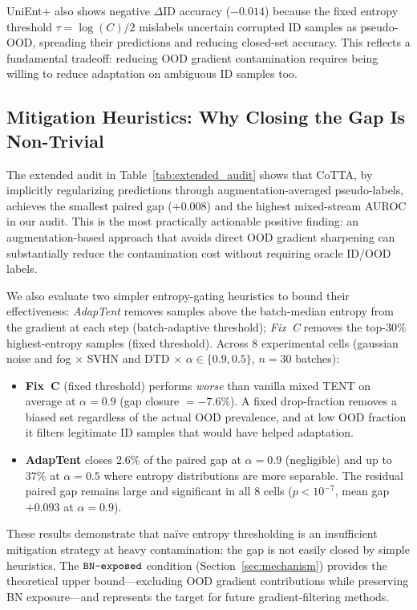 UniEnt+ also shows negative $\Delta$ID accuracy ($-0.014$) because the fixed entropy threshold $\tau = \log(C)/2$ mislabels uncertain corrupted ID samples as pseudo-OOD, spreading their predictions and reducing closed-set accuracy.
This reflects a fundamental tradeoff: reducing OOD gradient contamination requires being willing to reduce adaptation on ambiguous ID samples too.

\subsection{Mitigation Heuristics: Why Closing the Gap Is Non-Trivial}
\label{sec:mitigation}

The extended audit in Table~\ref{tab:extended_audit} shows that CoTTA, by implicitly regularizing predictions through augmentation-averaged pseudo-labels, achieves the smallest paired gap ($+0.008$) and the highest mixed-stream AUROC in our audit.
This is the most practically actionable positive finding: an augmentation-based approach that avoids direct OOD gradient sharpening can substantially reduce the contamination cost without requiring oracle ID/OOD labels.

We also evaluate two simpler entropy-gating heuristics to bound their effectiveness:
\emph{AdapTent} removes samples above the batch-median entropy from the gradient at each step (batch-adaptive threshold); \emph{Fix~C} removes the top-$30\%$ highest-entropy samples (fixed threshold).
Across 8 experimental cells (gaussian noise and fog $\times$ SVHN and DTD $\times$ $\alpha \in \{0.9, 0.5\}$, $n = 30$ batches):

\begin{itemize}[leftmargin=*,topsep=2pt,itemsep=1pt]
  \item \textbf{Fix~C} (fixed threshold) performs \emph{worse} than vanilla mixed TENT on average at $\alpha = 0.9$ (gap closure $= -7.6\%$). A fixed drop-fraction removes a biased set regardless of the actual OOD prevalence, and at low OOD fraction it filters legitimate ID samples that would have helped adaptation.
  \item \textbf{AdapTent} closes $2.6\%$ of the paired gap at $\alpha = 0.9$ (negligible) and up to $37\%$ at $\alpha = 0.5$ where entropy distributions are more separable. The residual paired gap remains large and significant in all 8 cells ($p < 10^{-7}$, mean gap $+0.093$ at $\alpha = 0.9$).
\end{itemize}

These results demonstrate that naïve entropy thresholding is an insufficient mitigation strategy at heavy contamination: the gap is not easily closed by simple heuristics.
The $\texttt{BN-exposed}$ condition (Section~\ref{sec:mechanism}) provides the theoretical upper bound---excluding OOD gradient contributions while preserving BN exposure---and represents the target for future gradient-filtering methods.

